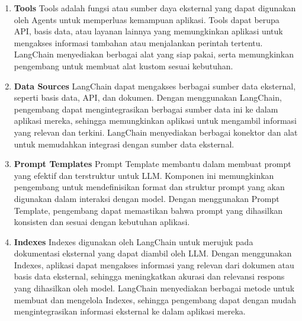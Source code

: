 \begin{enumerate}
  \item \textbf{Tools} \newline
  Tools adalah fungsi atau sumber daya eksternal yang dapat digunakan oleh Agents untuk memperluas kemampuan aplikasi. Tools dapat berupa API, basis data, atau layanan lainnya yang memungkinkan aplikasi untuk mengakses informasi tambahan atau menjalankan perintah tertentu. LangChain menyediakan berbagai alat yang siap pakai, serta memungkinkan pengembang untuk membuat alat kustom sesuai kebutuhan.

  \item \textbf{Data Sources} \newline
  LangChain dapat mengakses berbagai sumber data eksternal, seperti basis data, API, dan dokumen. Dengan menggunakan LangChain, pengembang dapat mengintegrasikan berbagai sumber data ini ke dalam aplikasi mereka, sehingga memungkinkan aplikasi untuk mengambil informasi yang relevan dan terkini. LangChain menyediakan berbagai konektor dan alat untuk memudahkan integrasi dengan sumber data eksternal.

  \item \textbf{Prompt Templates} \newline
  Prompt Template membantu dalam membuat prompt yang efektif dan terstruktur untuk LLM. Komponen ini memungkinkan pengembang untuk mendefinisikan format dan struktur prompt yang akan digunakan dalam interaksi dengan model. Dengan menggunakan Prompt Template, pengembang dapat memastikan bahwa prompt yang dihasilkan konsisten dan sesuai dengan kebutuhan aplikasi.

  \item \textbf{Indexes} \newline
  Indexes digunakan oleh LangChain untuk merujuk pada dokumentasi eksternal yang dapat diambil oleh LLM. Dengan menggunakan Indexes, aplikasi dapat mengakses informasi yang relevan dari dokumen atau basis data eksternal, sehingga meningkatkan akurasi dan relevansi respons yang dihasilkan oleh model. LangChain menyediakan berbagai metode untuk membuat dan mengelola Indexes, sehingga pengembang dapat dengan mudah mengintegrasikan informasi eksternal ke dalam aplikasi mereka.
\end{enumerate}
